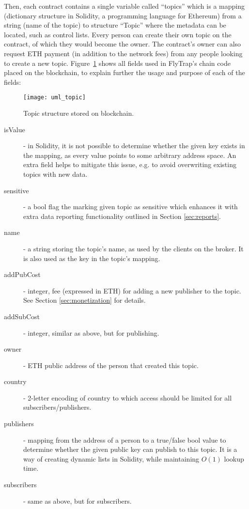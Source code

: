 Then, each contract contains a single variable called ``topics'' which is a mapping (dictionary structure in Solidity, a programming language for Ethereum) from a string (name of the topic) to structure ``Topic'' where the metadata can be located, such as control lists. Every person can create their own topic on the contract, of which they would become the owner. The contract's owner can also request ETH payment (in addition to the network fees) from any people looking to create a new topic. Figure~\ref{fig:uml_topic} shows all fields used in FlyTrap's chain code placed on the blockchain, to explain further the usage and purpose of each of the fields:
\begin{figure}[h]
    \centering
    \texttt{[image: uml\_topic]}
    \caption{Topic structure stored on blockchain.}
    \label{fig:uml_topic}
\end{figure}
\begin{description}
    \item[isValue] - in Solidity, it is not possible to determine whether the given key exists in the mapping, as every value points to some arbitrary address space. An extra field helps to mitigate this issue, e.g. to avoid overwriting existing topics with new data.
    \item[sensitive] - a bool flag the marking given topic as sensitive which enhances it with extra data reporting functionality outlined in Section \ref{sec:reports}.
    \item[name] - a string storing the topic's name, as used by the clients on the broker. It is also used as the key in the topic's mapping.
    \item[addPubCost] - integer, fee (expressed in ETH) for adding a new publisher to the topic. See Section \ref{sec:monetization} for details.
    \item[addSubCost] - integer, similar as above, but for publishing.
    \item[owner] - ETH public address of the person that created this topic.
    \item[country] - 2-letter encoding of country to which access should be limited for all subscribers/publishers.
    \item[publishers] - mapping from the address of a person to a true/false bool value to determine whether the given public key can publish to this topic. It is a way of creating dynamic lists in Solidity, while maintaining $O(1)$ lookup time.
    \item[subscribers] - same as above, but for subscribers.
\end{description}

